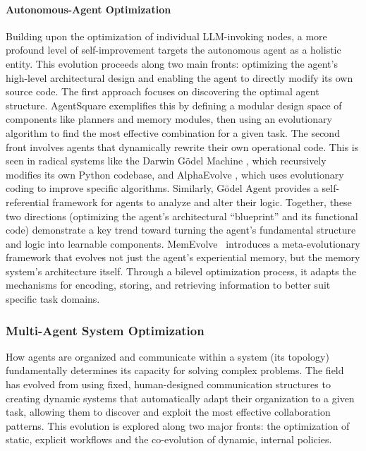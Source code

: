 \paragraph{Autonomous-Agent Optimization}
Building upon the optimization of individual LLM-invoking nodes, a more profound level of self-improvement targets the autonomous agent as a holistic entity. This evolution proceeds along two main fronts: optimizing the agent's high-level architectural design and enabling the agent to directly modify its own source code. The first approach focuses on discovering the optimal agent structure. AgentSquare \citep{shang2025agentsquare} exemplifies this by defining a modular design space of components like planners and memory modules, then using an evolutionary algorithm to find the most effective combination for a given task. The second front involves agents that dynamically rewrite their own operational code. This is seen in radical systems like the Darwin Gödel Machine \citep{zhang2025darwin}, which recursively modifies its own Python codebase, and AlphaEvolve \citep{novikov2025alphaevolve}, which uses evolutionary coding to improve specific algorithms. Similarly, Gödel Agent \citep{yin2025godelagentselfreferentialagent} provides a self-referential framework for agents to analyze and alter their logic. Together, these two directions (optimizing the agent's architectural “blueprint” and its functional code) demonstrate a key trend toward turning the agent's fundamental structure and logic into learnable components. MemEvolve~\citep{zhang2025memevolve} introduces a meta-evolutionary framework that evolves not just the agent's experiential memory, but the memory system's architecture itself. Through a bilevel optimization process, it adapts the mechanisms for encoding, storing, and retrieving information to better suit specific task domains.

\subsubsection{Multi-Agent System Optimization}

How agents are organized and communicate within a system (its topology) fundamentally determines its capacity for solving complex problems. The field has evolved from using fixed, human-designed communication structures to creating dynamic systems that automatically adapt their organization to a given task, allowing them to discover and exploit the most effective collaboration patterns. This evolution is explored along two major fronts: the optimization of static, explicit workflows and the co-evolution of dynamic, internal policies.
